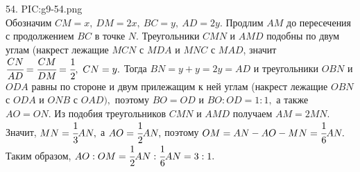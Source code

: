54. {{PIC:g9-54.png}}\\
Обозначим $CM=x,\ DM=2x,\ BC=y,\ AD=2y.$ Продлим $AM$ до пересечения с продолжением $BC$ в точке $N.$ Треугольники $CMN$ и $AMD$ подобны по двум углам (накрест лежащие  $MCN$ с $MDA$ и $MNC$ с $MAD$, значит $\cfrac{CN}{AD}=\cfrac{CM}{DM}=\cfrac{1}{2},\ CN=y.$ Тогда $BN=y+y=2y=AD$ и треугольники $OBN$ и $ODA$ равны по стороне и двум прилежащим к ней углам (накрест лежащие $OBN$ с $ODA$ и $ONB$ с $OAD),$ поэтому $BO=OD$ и $BO:OD=1:1,$ а также $AO=ON.$ Из подобия треугольников $CMN$ и $AMD$ получаем $AM=2MN.$ Значит, $MN=\cfrac{1}{3}AN,$ а $AO=\cfrac{1}{2}AN,$ поэтому $OM=AN-AO-MN=\cfrac{1}{6}AN.$ Таким образом, $AO:OM=\cfrac{1}{2}AN:\cfrac{1}{6}AN=3:1.$\\
